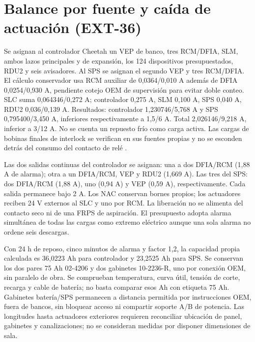 \section{Balance por fuente y caída de actuación (EXT-36)}
\label{sec:sd4-ext36}
Se asignan al controlador Cheetah un VEP de banco, tres RCM/DFIA, SLM, ambos lazos principales y de expansión, los 124 dispositivos presupuestados, RDU2 y seis avisadores. Al SPS se asignan el segundo VEP y tres RCM/DFIA. El cálculo conservador usa RCM auxiliar de 0,0364/0,010 A además de DFIA 0,0254/0,930 A, pendiente cotejo OEM de supervisión para evitar doble conteo. SLC suma 0,064346/0,272 A; controlador 0,275 A, SLM 0,100 A, SPS 0,040 A, RDU2 0,036/0,139 A. Resultados: controlador 1,230746/5,768 A y SPS 0,795400/3,450 A, inferiores respectivamente a 1,5/6 A. Total 2,026146/9,218 A, inferior a 3/12 A. No se cuenta un repuesto frío como carga activa. Las cargas de bobinas finales de interlock se verifican en sus fuentes propias y no se esconden detrás del consumo del contacto de relé \parencite[ap.~A]{lote33-cheetah11}.

Las dos salidas continuas del controlador se asignan: una a dos DFIA/RCM (1,88 A de alarma); otra a un DFIA/RCM, VEP y RDU2 (1,669 A). Las tres del SPS: dos DFIA/RCM (1,88 A), uno (0,94 A) y VEP (0,59 A), respectivamente. Cada salida permanece bajo 2 A. Los NAC conservan bornes propios; los actuadores reciben 24 V externos al SLC y uno por RCM. La liberación no se alimenta del contacto seco ni de una FRPS de aspiración. El presupuesto adopta alarma simultánea de todas las cargas como extremo eléctrico aunque una sola alarma no ordene seis descargas.

Con 24 h de reposo, cinco minutos de alarma y factor 1,2, la capacidad propia calculada es 36,0223 Ah para controlador y 23,2525 Ah para SPS. Se conservan los dos pares 75 Ah 02-4206 y dos gabinetes 10-2236-R, uno por conexión OEM, sin paralelo de obra. Se comprueban temperatura, curva útil, tensión de corte, recarga y cable de batería; no basta comparar esos Ah con etiqueta 75 Ah. Gabinetes batería/SPS permanecen a distancia permitida por instrucciones OEM, fuera de bancos, sin bloquear acceso ni compartir soporte A/B de potencia. Las longitudes hasta actuadores exteriores requieren reconciliar ubicación de panel, gabinetes y canalizaciones; no se consideran medidas por disponer dimensiones de sala.

